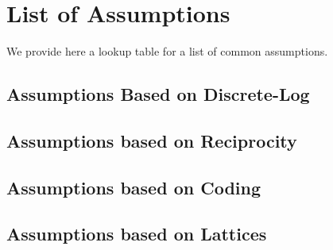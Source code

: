 \section{List of Assumptions}

We provide here a lookup table for a list of common assumptions.

\subsection{Assumptions Based on Discrete-Log}

\subsection{Assumptions based on Reciprocity}

\subsection{Assumptions based on Coding}

\subsection{Assumptions based on Lattices}